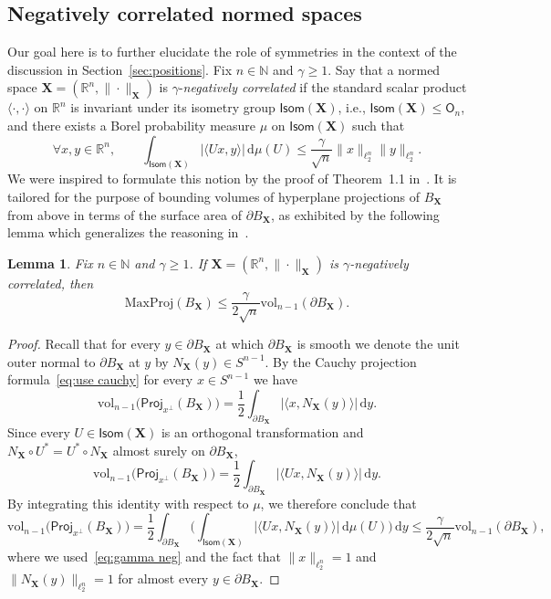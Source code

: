 \documentclass[11pt,reqno]{amsart}
\renewcommand{\le}{\leqslant}
\renewcommand{\ge}{\geqslant}
\newcommand{\ud}[0]{\,\mathrm{d}}
\newcommand{\proj}{\mathsf{Proj}}
\newcommand{\X}{\mathbf X}
\newcommand{\R}{\mathbb R}
\newtheorem{lemma}[theorem]{Lemma}
\theoremstyle{remark}
\renewcommand{\O}{\mathsf{O}}
\newcommand{\N}{\mathbb N}
\newcommand{\vol}{\mathrm{vol}}
\renewcommand{\1}{\mathbf 1}
\begin{document}
\subsection{Negatively correlated normed spaces}\label{sec:negative correlation} Our goal here is to further  elucidate the role of symmetries in the context of the discussion in Section~\ref{sec:positions}. Fix $n\in \N$ and $\gamma\ge 1$. Say that a normed space $\X=(\R^n,\|\cdot\|_\X)$ is $\gamma$-{\em negatively correlated} if the standard scalar product $\langle \cdot,\cdot\rangle$ on $\R^n$ is invariant under its isometry group $\mathsf{Isom}(\X)$, i.e., $\mathsf{Isom}(\X)\le \O_n$, and there exists a Borel probability measure $\mu$ on $\mathsf{Isom}(\X)$ such that
\begin{equation}\label{eq:gamma neg}
\forall x,y\in \R^n,\qquad \int_{\mathsf{Isom}(\X)} |\langle Ux,y\rangle|\ud\mu(U)\le \frac{\gamma}{\sqrt{n}}\|x\|_{\ell_2^n}\|y\|_{\ell_2^n}.
\end{equation}
We were inspired to formulate this notion by the proof of Theorem~1.1 in~\cite{Sch89}. It is tailored for the purpose of bounding volumes of hyperplane projections of $B_\X$ from above in terms of the surface area of $\partial B_\X$, as exhibited by the following lemma which generalizes the reasoning in~\cite{Sch89}.

\begin{lemma}\label{lem:re schutt}  Fix $n\in \N$ and $\gamma\ge 1$. If $\X=(\R^n,\|\cdot\|_\X)$ is $\gamma$-negatively correlated, then
$$
\mathrm{MaxProj}(B_\X)\le \frac{\gamma}{2\sqrt{n}}\vol_{n-1}(\partial B_{\X}).
$$
\end{lemma}

\begin{proof} Recall that for every $y\in \partial B_\X$ at which $\partial B_\X$ is smooth we denote the unit outer normal to $\partial B_\X$ at $y$ by $N_\X(y)\in S^{n-1}$. By the Cauchy projection formula~\eqref{eq:use cauchy} for every $x\in S^{n-1}$ we have
$$
\vol_{n-1}\big(\proj_{x^\perp}(B_{\X})\big)=\frac12\int_{\partial B_{\X}} |\langle x,N_\X(y)\rangle| \ud y.
$$
Since every $U\in \mathsf{Isom}(\X)$ is an orthogonal transformation and $N_\X\circ U^{*}=U^{*}\circ N_\X$ almost surely on $\partial B_\X$,
$$
\vol_{n-1}\big(\proj_{x^\perp}(B_{\X})\big)=\frac12\int_{\partial B_{\X}} |\langle Ux,N_\X(y)\rangle| \ud y.
$$
By integrating this identity with respect to $\mu$, we therefore conclude that
$$
\vol_{n-1}\big(\proj_{x^\perp}(B_{\X})\big)= \frac12\int_{\partial B_{\X}} \bigg(\int_{\mathsf{Isom}(\X)}|\langle   Ux,N_\X(y)\rangle|\ud\mu(U)\bigg) \ud y \le \frac{\gamma}{2\sqrt{n}}\vol_{n-1}(\partial B_{\X}),
$$
where we used~\eqref{eq:gamma neg} and the fact that $\|x\|_{\ell_2^n}=1$ and $\|N_\X(y)\|_{\ell_2^n}=1$ for almost every $y\in \partial B_\X$.
\end{proof}
\end{document}
